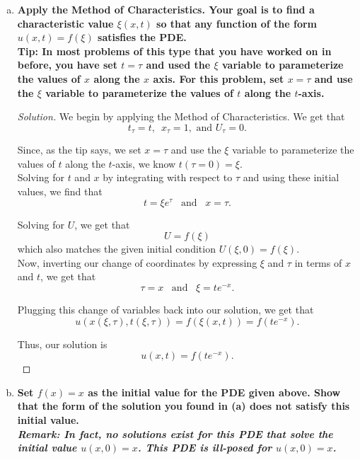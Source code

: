 \documentclass[11pt]{article}
\newenvironment{solution}
  {\renewcommand\qedsymbol{$\blacksquare$}\begin{proof}[Solution]}
  {\end{proof}}
\begin{document}
\begin{enumerate}[(a)]
    \item \textbf{Apply the Method of Characteristics. Your goal is to find a characteristic value $\xi(x, t)$ so that any function of the form $u(x, t) = f(\xi)$ satisfies the PDE.} \\
     
    \textbf{Tip: In most problems of this type that you have worked on in before, you have set $t = \tau$
    and used the $\xi$ variable to parameterize the values of $x$ along the $x$ axis. For this problem,
    set $x=\tau$ and use the $\xi$ variable to parameterize the values of $t$ along the $t$-axis.}
    
    \begin{solution}
    We begin by applying the Method of Characteristics. We get that 
    \[ t_{\tau} = t, \, \, \, x_{\tau} = 1, \text{ and } U_{\tau} = 0.\]

    Since, as the tip says, we set $x = \tau$ and use the $\xi$ variable to parameterize the values of $t$ along the $t$-axis, we know $t(\tau = 0) = \xi.$ \\

    Solving for $t$ and $x$ by integrating with respect to $\tau$ and using these initial values, we find that 
    \[ t = \xi e^{\tau} \, \, \, \text{ and } \, \, \, x = \tau.\]

    Solving for $U$, we get that \[ U = f(\xi)\] which also matches the given initial condition $U(\xi, 0) = f(\xi).$ \\

    Now, inverting our change of coordinates by expressing $\xi$ and $\tau$ in terms of $x$ and $t$, we get that \[ \tau = x \, \, \, \text{ and } \, \, \, \xi = te^{-x}.\]

    Plugging this change of variables back into our solution, we get that
    \[u(x(\xi, \tau), t(\xi, \tau)) = f(\xi(x, t)) = f(te^{-x}).\]

    Thus, our solution is \[\boxed{u(x, t) = f(te^{-x})}.\]
    
    \end{solution}
    \item \textbf{Set $f(x) = x$ as the initial value for the PDE given above. Show that the form of the solution you found in (a) does not satisfy this initial value. } \\
     
    \textbf{\textit{Remark: In fact, no solutions exist for this PDE that solve the initial value $u(x, 0) = x$. This PDE is ill-posed for $u(x, 0) = x$.}}


\end{enumerate}
\end{document}
